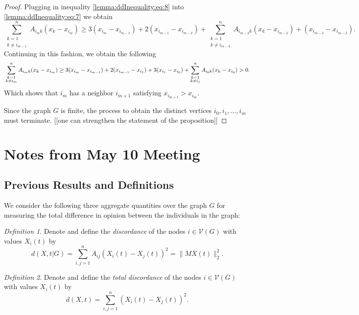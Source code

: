 \documentclass{article}
\theoremstyle{remark}
\newtheorem{definition}{Definition}
\begin{document}
\begin{proof}
	Plugging in inequality \eqref{lemma:ddInequality:eq:8} into \eqref{lemma:ddInequality:eq:7} we obtain
	\begin{equation}
		\sum_{\substack{k=1\\k\neq i_{m-1}}}^nA_{i_mk}(x_k-x_{i_m}) \geq 3(x_{i_m}-x_{i_{m-1}}) + 2(x_{i_{m-1}}-x_{i_{m-2}}) + \sum_{\substack{k=1\\k\neq i_{m-3}}}^nA_{i_{m-2}k}(x_k-x_{i_{m-2}}) + (x_{i_{m-3}}-x_{i_{m-2}}).
	\end{equation}
	Continuing in this fashion, we obtain the following
	\begin{equation}{\label{lemma:ddInequality:eq:7}}
		\sum_{\substack{k=1\\k\neq i_{m}}}^nA_{i_mk}(x_k-x_{i_m}) \geq 3(x_{i_m}-x_{i_{m-1}}) + 2(x_{i_{m-1}}-x_{i_1}) + 3(x_{i_1}-x_{i_0}) + \sum_{\substack{k=1\\k\neq i_1}}^nA_{i_0k}(x_k-x_{i_0}) > 0.
	\end{equation}
	Which shows that $i_m$ has a neighbor $i_{m+1}$ satisfying $x_{i_{m+1}}>x_{i_m}$.

	Since the graph $G$ is finite, the process to obtain the distinct vertices $i_0,i_1,\ldots,i_m$ must terminate. [[one can strengthen the statement of the proposition]]
\end{proof}

\section{Notes from May 10 Meeting}

\subsection{Previous Results and Definitions}

We consider the following three aggregate quantities over the graph $G$ for measuring the total difference in opinion between the individuals in the graph:
\begin{definition}{\label{defn:discordance}}
	Denote and define the \textit{discordance} of the nodes $i\in\mathcal{V}(G)$ with values $X_i(t)$ by 
\begin{equation*}
	d(X,t|G) = \sum_{i,j=1}^nA_{ij}(X_i(t)-X_j(t))^2 = \|MX(t)\|_2^2.
\end{equation*}
\end{definition}

\begin{definition}{\label{defn:totalDiscordance}}
	Denote and define the \textit{total discordance} of the nodes $i\in\mathcal{V}(G)$ with values $X_i(t)$ by
\begin{equation*}
	d(X,t)= \sum_{i,j=1}^n(X_i(t)-X_j(t))^2.
\end{equation*}
\end{definition}
\end{document}
